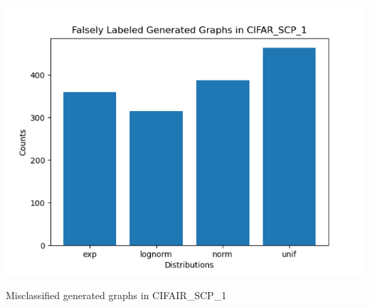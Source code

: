 \documentclass[12pt]{article}
\begin{document}
            \begin{table}
            
                \begin{center}

                    \includegraphics[scale=0.7]{misclassified-gen-in-cifar-scp-1.png}
                    \caption{Misclassified generated graphs in CIFAIR\_SCP\_1}
                    \label{mis-gen-in-cifar-scp-1-chart}
        
                \end{center}
                
            \end{table}
\end{document}
